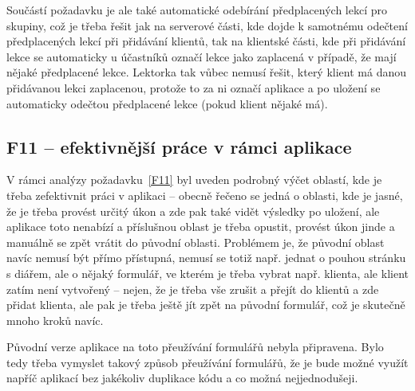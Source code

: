 Součástí požadavku je ale také automatické odebírání předplacených lekcí pro skupiny, což je třeba řešit jak na serverové části, kde dojde k samotnému odečtení předplacených lekcí při přidávání klientů, tak na klientské části, kde při přidávání lekce se automaticky u účastníků označí lekce jako zaplacená v případě, že mají nějaké předplacené lekce. Lektorka tak vůbec nemusí řešit, který klient má danou přidávanou lekci zaplacenou, protože to za ni označí aplikace a po uložení se automaticky odečtou předplacené lekce (pokud klient nějaké má).

\subsection{F11 -- efektivnější práce v rámci aplikace}

V rámci analýzy požadavku~\ref{F11} byl uveden podrobný výčet oblastí, kde je třeba zefektivnit práci v aplikaci -- obecně řečeno se jedná o oblasti, kde je jasné, že je třeba provést určitý úkon a zde pak také vidět výsledky po uložení, ale aplikace toto nenabízí a příslušnou oblast je třeba opustit, provést úkon jinde a manuálně se zpět vrátit do původní oblasti. Problémem je, že původní oblast navíc nemusí být přímo přístupná, nemusí se totiž např. jednat o pouhou stránku s diářem, ale o nějaký formulář, ve kterém je třeba vybrat např. klienta, ale klient zatím není vytvořený -- nejen, že je třeba vše zrušit a přejít do klientů a zde přidat klienta, ale pak je třeba ještě jít zpět na původní formulář, což je skutečně mnoho kroků navíc.

Původní verze aplikace na toto přeužívání formulářů nebyla připravena. Bylo tedy třeba vymyslet takový způsob přeužívání formulářů, že je bude možné využít napříč aplikací bez jakékoliv duplikace kódu a co možná nejjednodušeji.

